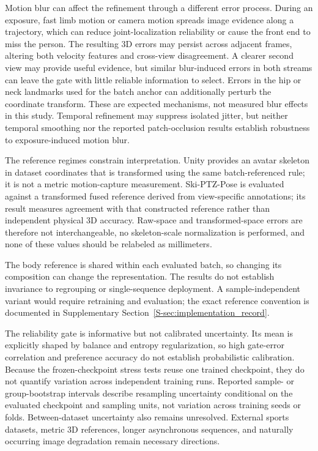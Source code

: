 \documentclass[preprint,12pt]{elsarticle}
\begin{document}
Motion blur can affect the refinement through a different error process. During an exposure, fast limb motion or camera motion spreads image evidence along a trajectory, which can reduce joint-localization reliability or cause the front end to miss the person. The resulting 3D errors may persist across adjacent frames, altering both velocity features and cross-view disagreement. A clearer second view may provide useful evidence, but similar blur-induced errors in both streams can leave the gate with little reliable information to select. Errors in the hip or neck landmarks used for the batch anchor can additionally perturb the coordinate transform. These are expected mechanisms, not measured blur effects in this study. Temporal refinement may suppress isolated jitter, but neither temporal smoothing nor the reported patch-occlusion results establish robustness to exposure-induced motion blur.

The reference regimes constrain interpretation. Unity provides an avatar skeleton in dataset coordinates that is transformed using the same batch-referenced rule; it is not a metric motion-capture measurement. Ski-PTZ-Pose is evaluated against a transformed fused reference derived from view-specific annotations; its result measures agreement with that constructed reference rather than independent physical 3D accuracy. Raw-space and transformed-space errors are therefore not interchangeable, no skeleton-scale normalization is performed, and none of these values should be relabeled as millimeters.

The body reference is shared within each evaluated batch, so changing its composition can change the representation. The results do not establish invariance to regrouping or single-sequence deployment. A sample-independent variant would require retraining and evaluation; the exact reference convention is documented in Supplementary Section~\ref{S-sec:implementation_record}.

The reliability gate is informative but not calibrated uncertainty. Its mean is explicitly shaped by balance and entropy regularization, so high gate-error correlation and preference accuracy do not establish probabilistic calibration. Because the frozen-checkpoint stress tests reuse one trained checkpoint, they do not quantify variation across independent training runs. Reported sample- or group-bootstrap intervals describe resampling uncertainty conditional on the evaluated checkpoint and sampling units, not variation across training seeds or folds. Between-dataset uncertainty also remains unresolved. External sports datasets, metric 3D references, longer asynchronous sequences, and naturally occurring image degradation remain necessary directions.
\end{document}
